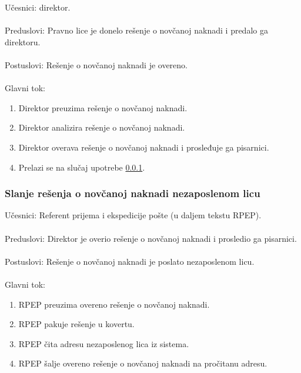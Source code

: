 \noindent Učesnici: direktor.
\\
\\ Preduslovi: Pravno lice je donelo rešenje o novčanoj naknadi i predalo ga direktoru.
\\
\\ Postuslovi: Rešenje o novčanoj naknadi je overeno.
\\
\\ Glavni tok:
\begin{enumerate}
\item Direktor preuzima rešenje o novčanoj naknadi.
\item Direktor analizira rešenje o novčanoj naknadi.
\item Direktor overava rešenje o novčanoj naknadi i prosleđuje ga pisarnici.
\item Prelazi se na slu\v caj upotrebe \ref{su: pisarnica}.
\end{enumerate}


\subsubsection{Slanje rešenja o novčanoj naknadi nezaposlenom licu}
\label{su: pisarnica}

\noindent Učesnici: Referent prijema i ekspedicije pošte (u daljem tekstu RPEP).
\\
\\ Preduslovi: Direktor je overio rešenje o novčanoj naknadi i prosledio ga pisarnici.
\\
\\ Postuslovi: Rešenje o novčanoj naknadi je poslato nezaposlenom licu.
\\
\\ Glavni tok:
\begin{enumerate}
\item RPEP preuzima overeno rešenje o novčanoj naknadi.
\item RPEP pakuje rešenje u kovertu.
\item RPEP čita adresu nezaposlenog lica iz sistema.
\item RPEP šalje overeno rešenje o novčanoj naknadi na pročitanu adresu.
\end{enumerate}

